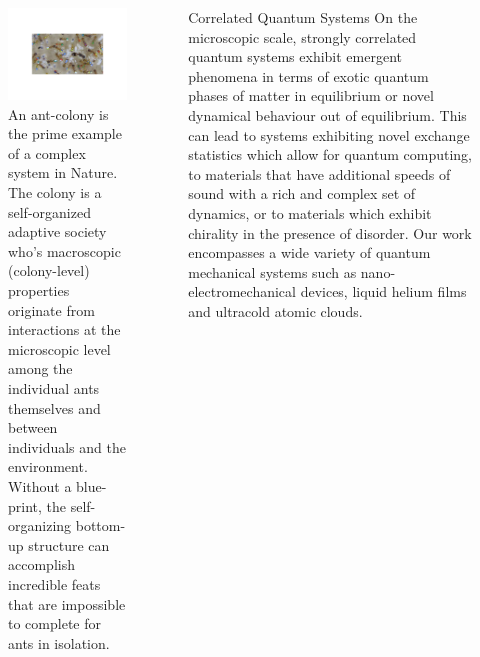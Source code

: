 \documentclass[xcolor={table}]{beamer}
\begin{document}
\begin{frame}[fragile=singleslide,t]
\begin{columns}[onlytextwidth,T]
\begin{column}{.47\textwidth}
\begin{figure}
    \centering
    \includegraphics[width=1.\columnwidth, height=0.2\textheight]{AntColony.pdf}
    \caption{\footnotesize An ant-colony is the prime example of a complex system in Nature. The colony is a self-organized adaptive society who’s macroscopic (colony-level) properties originate from interactions at the microscopic level among the individual ants themselves and between individuals and the environment. Without a blue-print, the self-organizing bottom-up structure can accomplish incredible feats that are impossible to complete for ants in isolation.}
\end{figure}

\end{column}

\begin{column}{.47\textwidth}

\begin{block}{Correlated Quantum Systems}
On the microscopic scale, strongly correlated quantum systems exhibit emergent
phenomena in terms of exotic quantum phases of matter in equilibrium or novel
dynamical behaviour out of equilibrium. This can lead to systems exhibiting
novel exchange statistics which allow for quantum computing, to materials that
have additional speeds of sound with a rich and complex set of dynamics, or to
materials which exhibit chirality in the presence of disorder. Our work
encompasses a wide variety of quantum mechanical systems such as
nano-electromechanical devices, liquid helium films and ultracold atomic clouds.
\end{block}


\end{column}
\end{columns}
\end{frame}
\end{document}
